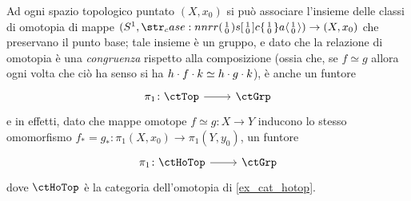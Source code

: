 \begin{example}\label{fun_ex_omoto_omolo}
 Ad ogni spazio topologico puntato \((X,x_0)\) si può associare l'insieme delle classi di omotopia di mappe \((S^1, \copmap[r] 10)\to (X, x_0)\) che preservano il punto base; tale insieme è un gruppo, e dato che la relazione di omotopia è una \emph{congruenza} rispetto alla composizione (ossia che, se \(f\simeq g\) allora ogni volta che ciò ha senso si ha \(h\cdot f\cdot k\simeq h\cdot g\cdot k\)), è anche un funtore
 \[\dmFun{\pi_1}\ctTop\ctGrp\]
 e in effetti, dato che mappe omotope \(f\simeq g \colon X\to Y\) inducono lo stesso omomorfismo \(f_* = g_* \colon \pi_1(X,x_0) \to \pi_1(Y,y_0)\), un funtore
 \[\dmFun{\pi_1}\ctHoTop\ctGrp\]
 dove \(\ctHoTop\) è la categoria dell'omotopia di \ref{ex_cat_hotop}.


\end{example}
